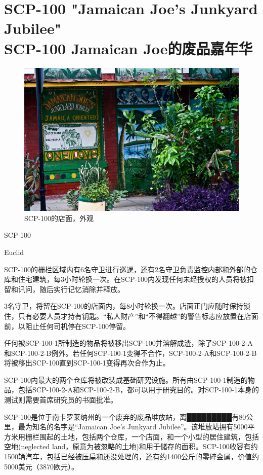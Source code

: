 \chapter[SCP-100 Jamaican Joe的废品嘉年华]{
    SCP-100 "Jamaican Joe's Junkyard Jubilee"\\
    SCP-100 Jamaican Joe的废品嘉年华
}

\label{chap:SCP-100}

\begin{figure}[H]
    \centering
    \includegraphics[width=0.5\linewidth]{images/SCP.100.png}
    \caption*{SCP-100的店面，外观}
\end{figure}

SCP-100

Euclid

SCP-100的栅栏区域内有6名守卫进行巡逻，还有2名守卫负责监控内部和外部的仓库和住宅建筑，每3小时轮换一次。在SCP-100内发现任何未经授权的人员将被扣留和讯问，随后实行记忆消除并释放。

3名守卫，将留在SCP-100的店面内，每8小时轮换一次。店面正门应随时保持锁住，只有必要人员才持有钥匙。“私人财产”和“不得翻越”的警告标志应放置在店面前，以阻止任何司机停在SCP-100停留。

任何被SCP-100-1所制造的物品将被移出SCP-100并溶解成渣，除了SCP-100-2-A和SCP-100-2-B例外。若任何SCP-100-1变得不合作，SCP-100-2-A和SCP-100-2-B将被移出SCP-100直到SCP-100-1变得再次合作为止。

SCP-100内最大的两个仓库将被改装成基础研究设施。所有由SCP-100-1制造的物品，包括SCP-100-2-A和SCP-100-2-B，都可以用于研究目的。对SCP-100-1本身的测试则需要首席研究员的书面批准。

SCP-100是位于南卡罗莱纳州的一个废弃的废品堆放站，离█████████有80公里，最为知名的名字是“Jamaican Joe's Junkyard Jubilee”。该堆放站拥有5000平方米用栅栏围起的土地，包括两个仓库，一个店面，和一个小型的居住建筑，包括空地(neglected land，原意为被忽略的土地)和用于储存的面积。SCP-100收容有约1500辆汽车，包括已经被压扁和还没处理的，还有约1400公斤的零碎金属，价值约5000美元（3870欧元）。


